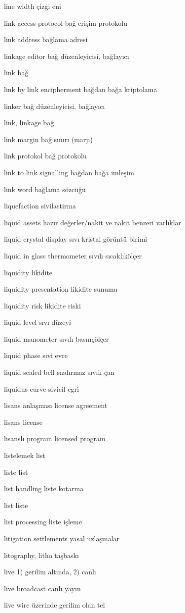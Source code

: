 \documentclass[12pt,fleqn]{article}\usepackage{../../common}
\begin{document}
line width çizgi eni

link access protocol bağ erişim protokolu

link address bağlama adresi

linkage editor bağ düzenleyicisi, bağlayıcı

link bağ

link by link encipherment bağdan bağa kriptolama

linker bağ düzenleyicisi, bağlayıcı

link, linkage bağ

link margin bağ sınırı (marjı)

link protokol bağ protokolu

link to link signalling bağdan bağa imleşim

link word bağlama sözcüğü

liquefaction sivilastirma

liquid assets hazır değerler/nakit ve nakit benzeri varlıklar

liquid crystal display sıvı kristal görüntü birimi

liquid in glass thermometer sıvılı sıcaklıkölçer

liquidity likidite

liquidity presentation likidite sunumu

liquidity risk likidite riski

liquid level sıvı düzeyi

liquid manometer sıvılı basınçölçer

liquid phase sivi evre

liquid sealed bell sızdırmaz sıvılı çan

liquidus curve sivicil egri

lisans anlaşması license agreement

lisans license

lisanslı program licensed program

listelemek list

liste list

list handling liste kotarma

list liste

list processing liste işleme

litigation settlements yasal uzlaşmalar

litography, litho taşbaskı

live 1) gerilim altında, 2) canlı

live broadcast canlı yayın

live wire üzerinde gerilim olan tel
\end{document}

